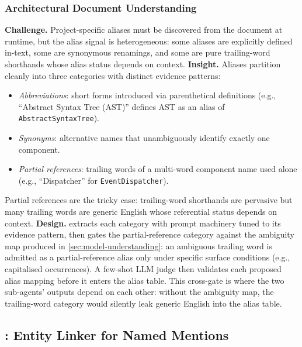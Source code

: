 \subsubsection{Architectural Document Understanding}\label{sec:doc-understanding}

\textbf{Challenge.} Project-specific aliases must be discovered from the document at runtime, but the alias signal is heterogeneous: some aliases are explicitly defined in-text, some are synonymous renamings, and some are pure trailing-word shorthands whose alias status depends on context.
\textbf{Insight.} Aliases partition cleanly into three categories with distinct evidence patterns:
\begin{itemize}
    \item \emph{Abbreviations}: short forms introduced via parenthetical definitions (e.g., ``Abstract Syntax Tree (AST)'' defines AST as an alias of \texttt{AbstractSyntaxTree}).
    \item \emph{Synonyms}: alternative names that unambiguously identify exactly one component.
    \item \emph{Partial references}: trailing words of a multi-word component name used alone (e.g., ``Dispatcher'' for \texttt{EventDispatcher}).
\end{itemize}
Partial references are the tricky case: trailing-word shorthands are pervasive but many trailing words are generic English whose referential status depends on context.
\textbf{Design.} \approach extracts each category with prompt machinery tuned to its evidence pattern, then gates the partial-reference category against the ambiguity map produced in \autoref{sec:model-understanding}: an ambiguous trailing word is admitted as a partial-reference alias only under specific surface conditions (e.g., capitalised occurrences).
A few-shot \ac{LLM} judge then validates each proposed alias mapping before it enters the alias table.
This cross-gate is where the two sub-agents' outputs depend on each other: without the ambiguity map, the trailing-word category would silently leak generic English into the alias table.

\subsection{\linkerB: Entity Linker for Named Mentions}\label{sec:entity-linker}

